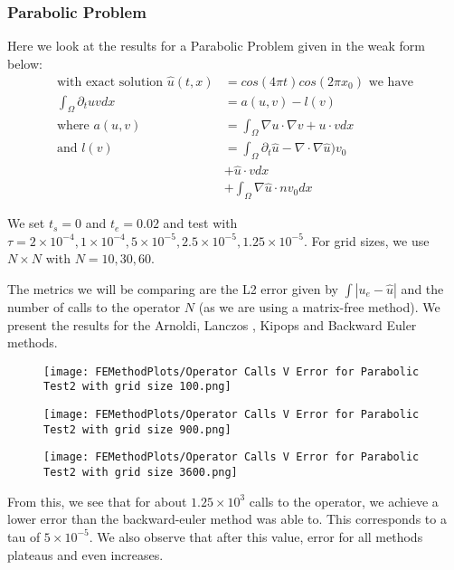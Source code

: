 \documentclass{article}
\begin{document}
\subsubsection{Parabolic Problem}
Here we look at the results for a Parabolic Problem given in the weak form below:
\begin{align*}
\text{with exact solution }\hat u(t,x) &= cos(4\pi t)cos(2\pi x_0) \text{ we have}\\
\int_{\Omega} \partial_tu v dx&= a(u,v) - l(v)\\
\text{where }a(u,v) &= \int_{\Omega} \nabla u \cdot \nabla v + u \cdot v dx\\
\text{and }l(v) &= \int_{\Omega}\partial_t\hat u - \nabla \cdot \nabla \hat u)  v_0\\
&+\hat u \cdot vdx\\
&+\int_{\Omega} \nabla \hat u \cdot n v_0 dx
\end{align*}

We set $t_s = 0$ and $t_e = 0.02$ and test with $\tau = 2\times 10^{-4}, 1\times 10^{-4}, 5\times 10^{-5}, 2.5\times 10^{-5}, 1.25\times 10^{-5}$.
For grid sizes, we use $N\times N$ with $N = 10,30,60$.

The metrics we will be comparing are the L2 error given by $\int |u_e - \hat u|$ and the number of calls to the operator $N$ (as we are using a matrix-free method).
We present the results for the Arnoldi, Lanczos , Kipops\cite{Gaudreault2018} and Backward Euler methods.

\begin{figure}[H]
	  \texttt{[image: FEMethodPlots/Operator Calls V Error for Parabolic Test2 with grid size 100.png]}
\end{figure}
\begin{figure}[H]
	  \texttt{[image: FEMethodPlots/Operator Calls V Error for Parabolic Test2 with grid size 900.png]}
\end{figure}
\begin{figure}[H]
	  \texttt{[image: FEMethodPlots/Operator Calls V Error for Parabolic Test2 with grid size 3600.png]}
\end{figure}

From this, we see that for about $1.25\times 10^{3}$ calls to the operator, we achieve a lower error than the backward-euler method was able to.
This corresponds to a tau of $ 5\times 10^{-5}$.
We also observe that after this value, error for all methods plateaus and even increases.
\end{document}
